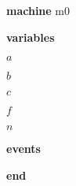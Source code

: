 \begin{block}
  \item   \textbf{machine} m0
  \item   \textbf{variables}
  \begin{block}
    \item   $a$
    \item   $b$
    \item   $c$
    \item   $f$
    \item   $n$
  \end{block}
  \item   
  \item   
  \item   
  \item   
  \item   \textbf{events}
  \begin{block}
    \item   
  \end{block}
  \item   \textbf{end} \\
\end{block}
